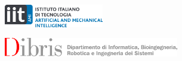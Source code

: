 	

\vfill

\begin{figure}[h!]
\centering
\begin{subfigure}{0.4 \textwidth}
\centering
  \includegraphics[height=1cm]{Figs/AMI T2 POS.png}
\end{subfigure}
\hfill
\begin{subfigure}{0.59\textwidth}
 \centering
\includegraphics[height=0.8cm]{Figs/Dibris con dicitura orizzontale RGB.pdf}
\end{subfigure}
\end{figure}


